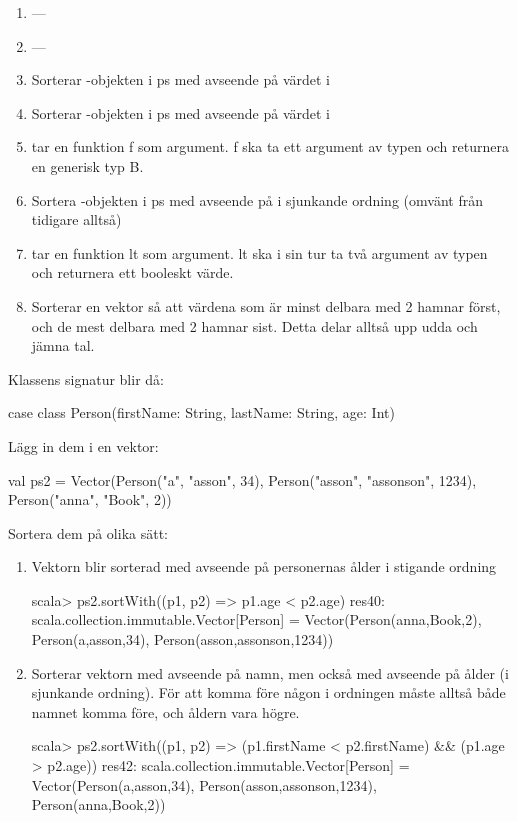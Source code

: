 \SubtaskSolved

\begin{enumerate}
\item ---
\item ---
\item Sorterar -objekten i ps med avseende på värdet i 
\item Sorterar -objekten i ps med avseende på värdet i 
\item {} tar en funktion f som argument. f ska ta ett argument av typen  och returnera en generisk typ B.
\item Sortera -objekten i ps med avseende på  i sjunkande ordning (omvänt från tidigare alltså)
\item {} tar en funktion lt som argument. lt ska i sin tur ta två argument av typen  och returnera ett booleskt värde.
\item Sorterar en vektor så att värdena som är minst delbara med 2 hamnar först, och de mest delbara med 2 hamnar sist. Detta delar alltså upp udda och jämna tal.
\end{enumerate}

\SubtaskSolved
Klassens signatur blir då:
\begin{REPLnonum}
case class Person(firstName: String, lastName: String, age: Int)
\end{REPLnonum}

Lägg in dem i en vektor:
\begin{REPLnonum}
val ps2 = Vector(Person("a", "asson", 34), Person("asson", "assonson", 1234),
Person("anna", "Book", 2))
\end{REPLnonum}

Sortera dem på olika sätt:
\begin{enumerate}
\item
Vektorn blir sorterad med avseende på personernas ålder i stigande ordning
\begin{REPLnonum}
scala> ps2.sortWith((p1, p2) => p1.age < p2.age)
res40: scala.collection.immutable.Vector[Person] = Vector(Person(anna,Book,2),
Person(a,asson,34), Person(asson,assonson,1234))
\end{REPLnonum}

\item
Sorterar vektorn med avseende på namn, men också med avseende på ålder (i sjunkande ordning). För att komma före någon i ordningen måste alltså både namnet komma före, och åldern vara högre.
\begin{REPLnonum}
scala> ps2.sortWith((p1, p2) => (p1.firstName < p2.firstName) &&
(p1.age > p2.age))
res42: scala.collection.immutable.Vector[Person] = Vector(Person(a,asson,34),
Person(asson,assonson,1234), Person(anna,Book,2))
\end{REPLnonum}
\end{enumerate}



